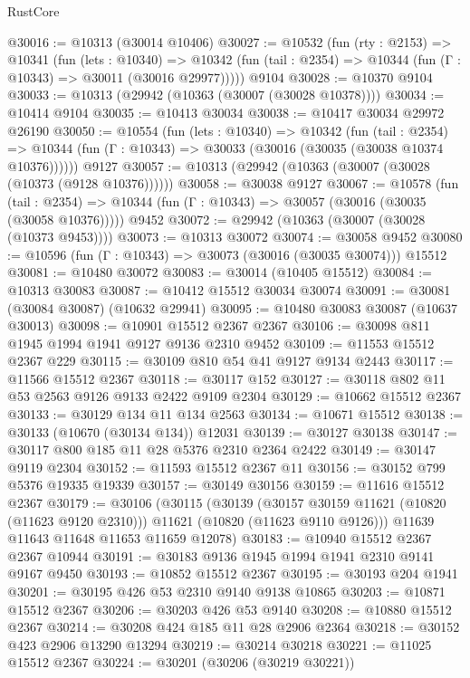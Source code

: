 \begin{lexlean}{RustCore}
\begin{coremodule}
@30016 := @10313 (@30014 @10406)
@30027 := @10532
    (fun (rty : @2153) =>
    @10341
      (fun (lets : @10340) =>
      @10342 (fun (tail : @2354) => @10344 (fun (Γ : @10343) => @30011 (@30016 @29977)))))
    @9104
@30028 := @10370 @9104
@30033 := @10313 (@29942 (@10363 (@30007 (@30028 @10378))))
@30034 := @10414 @9104
@30035 := @10413 @30034
@30038 := @10417 @30034 @29972 @26190
@30050 := @10554
    (fun (lets : @10340) =>
    @10342
      (fun (tail : @2354) =>
      @10344 (fun (Γ : @10343) => @30033 (@30016 (@30035 (@30038 @10374 @10376))))))
    @9127
@30057 := @10313 (@29942 (@10363 (@30007 (@30028 (@10373 (@9128 @10376))))))
@30058 := @30038 @9127
@30067 := @10578
    (fun (tail : @2354) => @10344 (fun (Γ : @10343) => @30057 (@30016 (@30035 (@30058 @10376)))))
    @9452
@30072 := @29942 (@10363 (@30007 (@30028 (@10373 @9453))))
@30073 := @10313 @30072
@30074 := @30058 @9452
@30080 := @10596 (fun (Γ : @10343) => @30073 (@30016 (@30035 @30074))) @15512
@30081 := @10480 @30072
@30083 := @30014 (@10405 @15512)
@30084 := @10313 @30083
@30087 := @10412 @15512 @30034 @30074
@30091 := @30081 (@30084 @30087) (@10632 @29941)
@30095 := @10480 @30083 @30087 (@10637 @30013)
@30098 := @10901 @15512 @2367 @2367
@30106 := @30098 @811 @1945 @1994 @1941 @9127 @9136 @2310 @9452
@30109 := @11553 @15512 @2367 @229
@30115 := @30109 @810 @54 @41 @9127 @9134 @2443
@30117 := @11566 @15512 @2367
@30118 := @30117 @152
@30127 := @30118 @802 @11 @53 @2563 @9126 @9133 @2422 @9109 @2304
@30129 := @10662 @15512 @2367
@30133 := @30129 @134 @11 @134 @2563
@30134 := @10671 @15512
@30138 := @30133 (@10670 (@30134 @134)) @12031
@30139 := @30127 @30138
@30147 := @30117 @800 @185 @11 @28 @5376 @2310 @2364 @2422
@30149 := @30147 @9119 @2304
@30152 := @11593 @15512 @2367 @11
@30156 := @30152 @799 @5376 @19335 @19339
@30157 := @30149 @30156
@30159 := @11616 @15512 @2367
@30179 := @30106
    (@30115
      (@30139
        (@30157 @30159 @11621 (@10820 (@11623 @9120 @2310)))
        @11621
        (@10820 (@11623 @9110 @9126)))
      @11639
      @11643
      @11648
      @11653
      @11659
      @12078)
@30183 := @10940 @15512 @2367 @2367 @10944
@30191 := @30183 @9136 @1945 @1994 @1941 @2310 @9141 @9167 @9450
@30193 := @10852 @15512 @2367
@30195 := @30193 @204 @1941
@30201 := @30195 @426 @53 @2310 @9140 @9138 @10865
@30203 := @10871 @15512 @2367
@30206 := @30203 @426 @53 @9140
@30208 := @10880 @15512 @2367
@30214 := @30208 @424 @185 @11 @28 @2906 @2364
@30218 := @30152 @423 @2906 @13290 @13294
@30219 := @30214 @30218
@30221 := @11025 @15512 @2367
@30224 := @30201 (@30206 (@30219 @30221))

\end{coremodule}
\end{lexlean}
